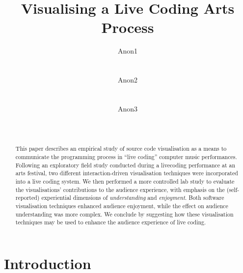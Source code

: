 \documentclass{sig-alternate}
\begin{document}

\title{Visualising a Live Coding Arts Process}

\author{
\alignauthor Anon1\\
       \affaddr{-}\\
       \affaddr{-}\\
       \email{-}
\alignauthor Anon2\\
       \affaddr{-}\\
       \affaddr{-}\\
       \email{-}
\alignauthor Anon3\\
       \affaddr{-}\\
       \affaddr{-}\\
       \email{-}
}

\maketitle
\begin{abstract}
  This paper describes an empirical study of source code visualisation
  as a means to communicate the programming process in ``live coding''
  computer music performances. Following an exploratory field study
  conducted during a livecoding performance at an arts festival, two
  different interaction-driven visualisation techniques were
  incorporated into a live coding system. We then performed a more
  controlled lab study to evaluate the visualisations' contributions
  to the audience experience, with emphasis on the (self-reported)
  experiential dimensions of \emph{understanding} and
  \emph{enjoyment}. Both software visualisation techniques enhanced
  audience enjoyment, while the effect on audience understanding was
  more complex. We conclude by suggesting how these visualisation
  techniques may be used to enhance the audience experience of live
  coding.
\end{abstract}




\section{Introduction}

\end{document}
